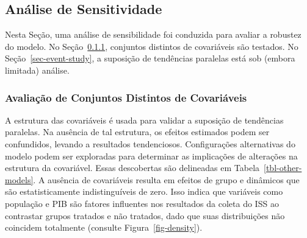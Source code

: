 \documentclass[12pt, a4paper, twoside]{article}
\numberwithin{equation}{subsection} %
\begin{document}
\hypertarget{sec-sensitivity-analysis}{%
\subsection{Análise de Sensitividade}\label{sec-sensitivity-analysis}}

Nesta Seção, uma análise de sensibilidade foi conduzida para avaliar a
robustez do modelo. No Seção~\ref{sec-covariates-sensitivity}, conjuntos
distintos de covariáveis \hspace{0pt}\hspace{0pt}são testados. No
Seção~\ref{sec-event-study}, a suposição de tendências paralelas está
sob (embora limitada) análise.

\hypertarget{sec-covariates-sensitivity}{%
\subsubsection{Avaliação de Conjuntos Distintos de Covariáveis
\hspace{0pt}\hspace{0pt}}\label{sec-covariates-sensitivity}}

A estrutura das covariáveis \hspace{0pt}é usada para validar a suposição
de tendências paralelas. Na ausência de tal estrutura, os efeitos
estimados podem ser confundidos, levando a resultados tendenciosos.
Configurações alternativas do modelo podem ser exploradas para
determinar as implicações de alterações na estrutura da covariável.
Essas descobertas são delineadas em Tabela~\ref{tbl-other-models}. A
ausência de covariáveis \hspace{0pt}\hspace{0pt}resulta em efeitos de
grupo e dinâmicos que são estatisticamente indistinguíveis de zero. Isso
indica que variáveis \hspace{0pt}\hspace{0pt}como população e PIB são
fatores influentes nos resultados da coleta do ISS ao contrastar grupos
tratados e não tratados, dado que suas distribuições não coincidem
totalmente (consulte Figura~\ref{fig-density}).
\end{document}
